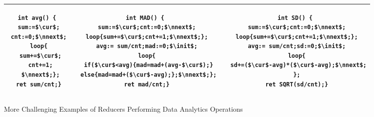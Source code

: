 \begin{figure}
	\centering
	\lstset{language=C,
		basicstyle=\ttfamily\scriptsize}
	\begin{tabular}{|c|c|c|}
		\hline
		\begin{minipage}[t]{0.2\textwidth}
		\vspace{-0.5cm}
			\begin{lstlisting}[mathescape=true]
int avg() {
 sum:=$\cur$;
 cnt:=0;$\nnext$;
 loop{
  sum+=$\cur$;
  cnt+=1;
  $\nnext$;};
 ret sum/cnt;}
			\end{lstlisting}
		\end{minipage}&
		\begin{minipage}[t]{0.4\textwidth}
		\vspace{-0.5cm}
\begin{lstlisting}[mathescape=true]
int MAD() {
 sum:=$\cur$;cnt:=0;$\nnext$;
 loop{sum+=$\cur$;cnt+=1;$\nnext$;};
 avg:= sum/cnt;mad:=0;$\init$;
 loop{
  if($\cur$<avg){mad=mad+(avg-$\cur$);}
  else{mad=mad+($\cur$-avg);};$\nnext$;};
 ret mad/cnt;}
\end{lstlisting}
		\end{minipage}&
		\begin{minipage}[t]{0.4\textwidth}
		\vspace{-0.5cm}
			\begin{lstlisting}[mathescape=true]
int SD() {
 sum:=$\cur$;cnt:=0;$\nnext$;
 loop{sum+=$\cur$;cnt+=1;$\nnext$;};
 avg:= sum/cnt;sd:=0;$\init$;
 loop{
  sd+=($\cur$-avg)*($\cur$-avg);$\nnext$;
 };
 ret SQRT(sd/cnt);}
			\end{lstlisting}
		\end{minipage}\\
		\hline		
	\end{tabular}
	\caption{More Challenging Examples of Reducers Performing Data Analytics Operations}
	\label{fig:examples2}
\end{figure}
